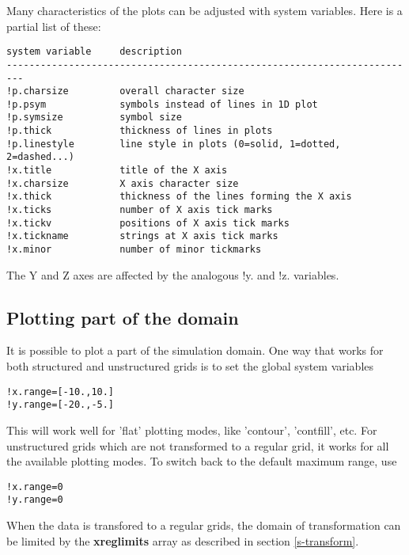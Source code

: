 \documentclass{article}
\begin{document}
   Many characteristics of the plots can be adjusted with system variables.
   Here is a partial list of these:
\begin{verbatim}
system variable     description
-------------------------------------------------------------------------
!p.charsize         overall character size
!p.psym             symbols instead of lines in 1D plot
!p.symsize          symbol size
!p.thick            thickness of lines in plots
!p.linestyle        line style in plots (0=solid, 1=dotted, 2=dashed...)
!x.title            title of the X axis
!x.charsize         X axis character size
!x.thick            thickness of the lines forming the X axis
!x.ticks            number of X axis tick marks
!x.tickv            positions of X axis tick marks
!x.tickname         strings at X axis tick marks
!x.minor            number of minor tickmarks
\end{verbatim}
  The Y and Z axes are affected by the analogous !y. and !z. variables.

\subsection{Plotting part of the domain \label{s-plot-part}}

   It is possible to plot a part of the simulation domain.
   One way that works for both structured and unstructured grids is
   to set the global system variables
\begin{verbatim}
!x.range=[-10.,10.]
!y.range=[-20.,-5.]
\end{verbatim}
   This will work well for 'flat' plotting modes, like 'contour',
   'contfill', etc. For unstructured grids which are not transformed
   to a regular grid, it works for all the available plotting modes.
   To switch back to the default maximum range, use
\begin{verbatim}
!x.range=0
!y.range=0
\end{verbatim}
   When the data is transfored to a regular grids, the domain of transformation
   can be limited by the {\bf xreglimits} array as described in section
   \ref{s-transform}. 
\end{document}

